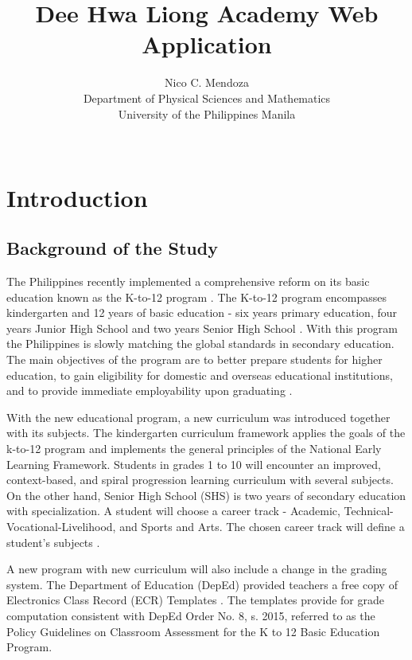 \documentclass[11pt,a4paper,titlepage]{article}
\title {Dee Hwa Liong Academy Web Application}
\author {Nico C. Mendoza \\ Department of Physical Sciences and Mathematics \\ University of the Philippines Manila \\ \\
}
\date{}
\let\stdsection\section
\renewcommand\section{\newpage\stdsection}
\begin{document}
\maketitle
\doublespacing

\begin{abstract}
\thispagestyle{plain}
\setcounter{page}{2}
\end{abstract}

\setcounter{page}{3}
\setcounter{tocdepth}{3}
\tableofcontents
\newpage

\section{Introduction}
\setcounter{page}{1}
\subsection{Background of the Study}

The Philippines recently implemented a comprehensive reform on its basic education known as the K-to-12 program \cite{Okabe}. The K-to-12 program encompasses kindergarten and 12 years of basic education - six years primary education, four years Junior High School and two years Senior High School \cite{Gazette}. With this program the Philippines is slowly matching the global standards in secondary education. The main objectives of the program are to better prepare students for higher education, to gain eligibility for domestic and overseas educational institutions, and to provide immediate employability upon graduating \cite{Okabe}.

With the new educational program, a new curriculum was introduced together with its subjects. The kindergarten curriculum framework applies the goals of the k-to-12 program and implements the general principles of the National Early Learning Framework. Students in grades 1 to 10 will encounter an improved, context-based, and spiral progression learning curriculum with several subjects. On the other hand, Senior High School (SHS) is two years of secondary education with specialization. A student will choose a career track - Academic, Technical-Vocational-Livelihood, and Sports and Arts. The chosen career track will define a student's subjects \cite{Okabe}.

A new program with new curriculum will also include a change in the grading system. The Department of Education (DepEd) provided teachers a free copy of Electronics Class Record (ECR) Templates \cite{depEd}. The templates provide for grade computation consistent with DepEd Order No. 8, s. 2015, referred to as the Policy Guidelines on Classroom Assessment for the K to 12 Basic Education Program. 
\end{document}

